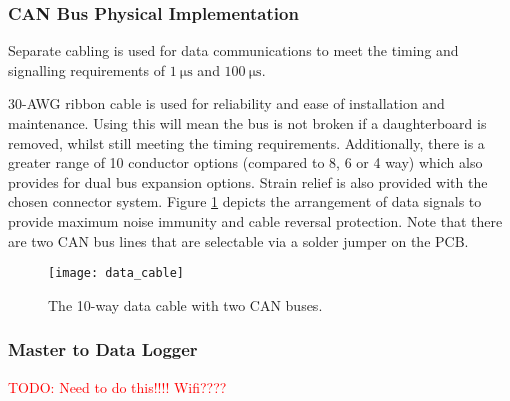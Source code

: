 \subsubsection{CAN Bus Physical Implementation}
Separate cabling is used for data communications to meet the timing and signalling requirements of $\SI{1}{\micro\second}$ and $\SI{100}{\micro\second}$.

30-AWG ribbon cable is used for reliability and ease of installation and maintenance.
Using this will mean the bus is not broken if a daughterboard is removed, whilst still meeting the timing requirements.
Additionally, there is a greater range of 10 conductor options (compared to 8, 6 or 4 way) which also provides for dual bus expansion options.
Strain relief is also provided with the chosen connector system.
Figure \ref{fig:data_cable} depicts the arrangement of data signals to provide maximum noise immunity and cable reversal protection.
Note that there are two CAN bus lines that are selectable via a solder jumper on the PCB.
\begin{figure}[H]
	\centering
	\texttt{[image: data\_cable]}
	\caption{The 10-way data cable with two CAN buses.}
	\label{fig:data_cable}
\end{figure}

\subsubsection{Master to Data Logger}
\textcolor{red}{TODO: Need to do this!!!! Wifi????}
